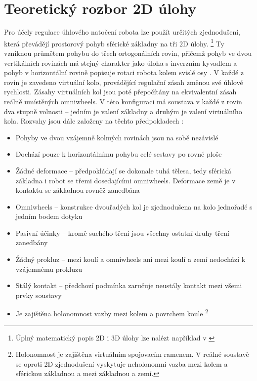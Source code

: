 \section{Teoretický rozbor 2D úlohy}
\label{rozbor}
 
Pro účely regulace úhlového natočení robota lze použít určitých zjednodušení, která převádějí prostorový pohyb sférické základny na tři 2D úlohy. \footnote{Úplný matematický popis 2D i 3D úlohy lze nalézt například v \cite{rezero} \cite{twente}} Ty vzniknou průmětem pohybu do třech ortogonálních rovin, přičemž pohyb ve dvou vertikálních rovinách má stejný charakter jako úloha s inverzním kyvadlem a pohyb v horizontální rovině popisuje rotaci robota kolem svislé osy \cite{rezero}. V každé z rovin je zavedeno virtuální kolo, provádějící regulační zásah změnou své úhlové rychlosti. Zásahy virtuálních kol jsou poté přepočítány na ekvivalentní zásah reálně umístěných omniwheels. V této konfiguraci má soustava v každé z rovin dva stupně volnosti – jedním je valení základny a druhým je valení virtuálního kola. Rozvahy jsou dále založeny na těchto předpokladech \cite{rezero}:


\begin{itemize}

\item Pohyby ve dvou vzájemně kolmých rovinách jsou na sobě nezávislé 
\item Dochází pouze k horizontálnímu pohybu celé sestavy po rovné ploše
\item Žádné deformace – předpokládají se dokonale tuhá tělesa, tedy sférická základna i robot se třemi dosedajícími omniwheels. Deformace země je v kontaktu se základnou rovněž zanedbána
\item Omniwheels – konstrukce dvouřadých kol je zjednodušena na kolo jednořadé s jedním bodem dotyku
\item Pasivní účinky – kromě suchého tření jsou všechny ostatní druhy tření zanedbány
\item Žádný prokluz – mezi koulí a omniwheels ani mezi koulí a zemí nedochází k vzájemnému prokluzu
\item Stálý kontakt – předchozí podmínka zaručuje neustály kontakt mezi všemi prvky soustavy
\item Je zajištěna holonomnost vazby mezi kolem a povrchem koule \footnote{Holonomnost je zajištěna virtuálním spojovacím ramenem. V reálné soustavě se oproti 2D zjednodušení vyskytuje neholonomní vazba mezi kolem a sférickou základnou a mezi základnou a zemí.}
\end{itemize}

